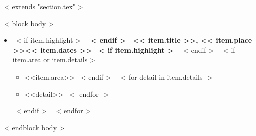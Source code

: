 ~< extends "section.tex" >~

~< block body >~
  \begin{itemize}
  \setlength\itemsep{1ex}
    ~< for item in items >~
      \item{
        ~< if item.highlight >~
        \textbf{
        ~< endif >~
        << item.title >>, << item.place >>\hfill << item.dates >>
        ~< if item.highlight >~
	\hspace*{-1.5ex} %
        }
        ~< endif >~
      }
      ~< if item.area or item.details >~
      \begin{itemize}
        ~< if item.area >~
          \item <<item.area>>
        ~< endif >~
        ~< for detail in item.details ->~
          \item <<detail>>
        ~<- endfor ->~
      \end{itemize}
      ~< endif >~
    ~< endfor >~
  \end{itemize}
~< endblock body >~
